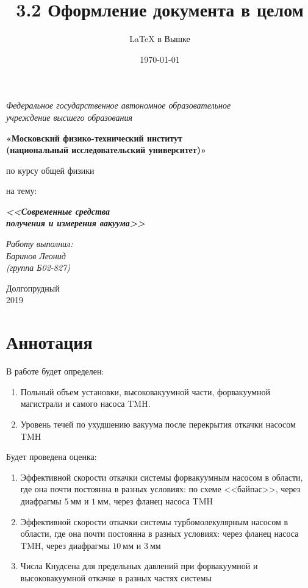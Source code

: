 \documentclass[a4paper,12pt]{article}
\author{\LaTeX{} в Вышке}
\title{3.2 Оформление документа в целом}
\date{\today}
\theoremstyle{plain} %
\theoremstyle{definition} %
\theoremstyle{remark} %
\begin{document}
	\thispagestyle{empty}
	\begin{center}
		\textit{Федеральное государственное автономное образовательное\\ учреждение высшего образования }
		\vspace{0.5ex}
		
		\textbf{«Московский физико-технический институт\\ (национальный исследовательский университет)»}
	\end{center}
	\vspace{10ex}
	\begin{center}
		\vspace{13ex}
		\vspace{1ex}
		
		по курсу общей физики
		
		
		на тему:
		
		\textbf{\textit{<<Современные средства \\ получения и измерения вакуума>>}}
		\vspace{30ex}
		\begin{flushright}
			\noindent
			\textit{Работу выполнил:}
			\\
			\textit{Баринов Леонид \\(группа Б02-827)}
		\end{flushright}
		\vfill
		Долгопрудный \\2019
	\end{center}
	\newpage
	\setcounter{page}{1}
	\fancyhead[R]{\nouppercase{\leftmark}}
	\section{Аннотация}
	В работе будет определен:
	\begin{enumerate}
		\item Польный объем установки, высоковакуумной части, форвакуумной магистрали и самого насоса TMH. 
		\item Уровень течей по ухудшению вакуума после перекрытия откачки насосом TMH
	\end{enumerate} 
	
	Будет проведена оценка:
	\begin{enumerate}
		\item Эффективной скорости откачки системы форвакуумным насосом в области, где она почти постоянна в разных условиях: по схеме <<байпас>>, через диафрагмы $5\ \text{мм}$ и $1\ \text{мм}$, через фланец насоса TMH
		\item Эффективной скорости откачки системы турбомолекулярным насосом в области, где она почти постоянна в разных условиях: через фланец насоса TMH, через диафрагмы $10\ \text{мм}$ и $3 \ \text{мм}$
		\item Числа Кнудсена для предельных давлений при форвакуумной и высоковакуумной откачке в разных частях системы
	\end{enumerate}
\end{document}
